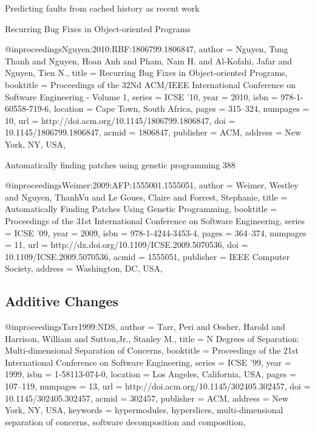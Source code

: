 \documentclass[runningheads,a4paper]{llncs}
\begin{document}
Predicting faults from cached history
as recent work

Recurring Bug Fixes in Object-oriented Programs

@inproceedings{Nguyen:2010:RBF:1806799.1806847,
 author = {Nguyen, Tung Thanh and Nguyen, Hoan Anh and Pham, Nam H. and Al-Kofahi, Jafar and Nguyen, Tien N.},
 title = {Recurring Bug Fixes in Object-oriented Programs},
 booktitle = {Proceedings of the 32Nd ACM/IEEE International Conference on Software Engineering - Volume 1},
 series = {ICSE '10},
 year = {2010},
 isbn = {978-1-60558-719-6},
 location = {Cape Town, South Africa},
 pages = {315--324},
 numpages = {10},
 url = {http://doi.acm.org/10.1145/1806799.1806847},
 doi = {10.1145/1806799.1806847},
 acmid = {1806847},
 publisher = {ACM},
 address = {New York, NY, USA},
}

Automatically finding patches using genetic programming 388

@inproceedings{Weimer:2009:AFP:1555001.1555051,
 author = {Weimer, Westley and Nguyen, ThanhVu and Le Goues, Claire and Forrest, Stephanie},
 title = {Automatically Finding Patches Using Genetic Programming},
 booktitle = {Proceedings of the 31st International Conference on Software Engineering},
 series = {ICSE '09},
 year = {2009},
 isbn = {978-1-4244-3453-4},
 pages = {364--374},
 numpages = {11},
 url = {http://dx.doi.org/10.1109/ICSE.2009.5070536},
 doi = {10.1109/ICSE.2009.5070536},
 acmid = {1555051},
 publisher = {IEEE Computer Society},
 address = {Washington, DC, USA},
} 



\subsection{Additive Changes}


@inproceedings{Tarr1999:NDS,
	author = {Tarr, Peri and Ossher, Harold and Harrison, William and Sutton,Jr., Stanley M.},
 title = {N Degrees of Separation: Multi-dimensional Separation of Concerns},
 booktitle = {Proceedings of the 21st International Conference on Software Engineering},
 series = {ICSE '99},
 year = {1999},
 isbn = {1-58113-074-0},
 location = {Los Angeles, California, USA},
 pages = {107--119},
 numpages = {13},
 url = {http://doi.acm.org/10.1145/302405.302457},
 doi = {10.1145/302405.302457},
 acmid = {302457},
 publisher = {ACM},
 address = {New York, NY, USA},
 keywords = {hypermodules, hyperslices, multi-dimensional separation of concerns, software decomposition and composition},
} 
\end{document}
